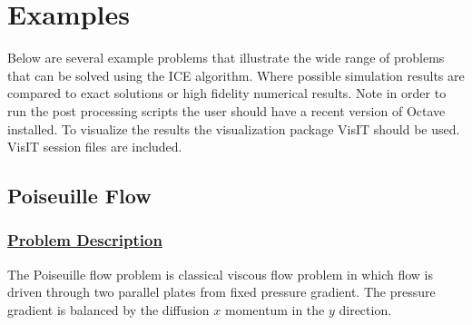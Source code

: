\newpage
\section{Examples}
Below are several example problems that illustrate the wide range of problems
that can be solved using the ICE algorithm.  Where possible simulation
results are compared to exact solutions or high fidelity numerical results.
Note in order to run the post processing scripts the user should have a
recent version of Octave installed.  To visualize the results the visualization
package VisIT should be used.  VisIT session files are included.
 
\subsection*{\center Poiseuille Flow}
\subsubsection*{\underline{Problem Description}}
The Poiseuille flow problem is classical viscous flow problem in which flow is
driven through two parallel plates from fixed pressure gradient.  The pressure
gradient is balanced by the diffusion $x$ momentum in the $y$ direction.

